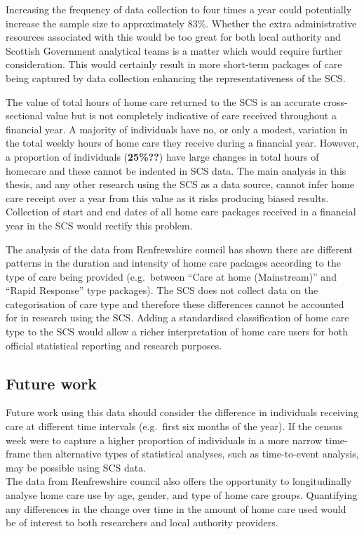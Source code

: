 \documentclass[]{article}
\begin{document}
Increasing the frequency of data collection to four times a year could
potentially increase the sample size to approximately 83\%. Whether the
extra administrative resources associated with this would be too great
for both local authority and Scottish Government analytical teams is a
matter which would require further consideration. This would certainly
result in more short-term packages of care being captured by data
collection enhancing the representativeness of the SCS.

The value of total hours of home care returned to the SCS is an accurate
cross-sectional value but is not completely indicative of care received
throughout a financial year. A majority of individuals have no, or only
a modest, variation in the total weekly hours of home care they receive
during a financial year. However, a proportion of individuals
(\textbf{25\%??}) have large changes in total hours of homecare and
these cannot be indented in SCS data. The main analysis in this thesis,
and any other research using the SCS as a data source, cannot infer home
care receipt over a year from this value as it risks producing biased
results. Collection of start and end dates of all home care packages
received in a financial year in the SCS would rectify this problem.

The analysis of the data from Renfrewshire council has shown there are
different patterns in the duration and intensity of home care packages
according to the type of care being provided (e.g.~between ``Care at
home (Mainstream)'' and ``Rapid Response'' type packages). The SCS does
not collect data on the categorisation of care type and therefore these
differences cannot be accounted for in research using the SCS. Adding a
standardised classification of home care type to the SCS would allow a
richer interpretation of home care users for both official statistical
reporting and research purposes.

\subsection{Future work}\label{subsec:renf-discuss-future}

Future work using this data should consider the difference in
individuals receiving care at different time intervals (e.g.~first six
months of the year). If the census week were to capture a higher
proportion of individuals in a more narrow time-frame then alternative
types of statistical analyses, such as time-to-event analysis, may be
possible using SCS data.\\
The data from Renfrewshire council also offers the opportunity to
longitudinally analyse home care use by age, gender, and type of home
care groups. Quantifying any differences in the change over time in the
amount of home care used would be of interest to both researchers and
local authority providers.
\end{document}
